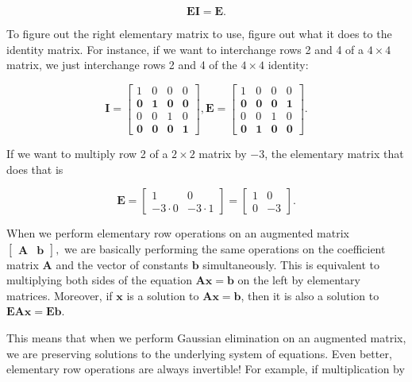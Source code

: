 \documentclass[
]{book}
\theoremstyle{definition}
\theoremstyle{definition}
\theoremstyle{definition}
\theoremstyle{definition}
\theoremstyle{remark}
\begin{document}
\[\mathbf{E}\mathbf{I}=\mathbf{E}.\]

To figure out the right elementary matrix to use, figure out what it does to the identity matrix. For instance, if we want to interchange rows 2 and 4 of a \(4\times 4\) matrix, we just interchange rows 2 and 4 of the \(4\times 4\) identity:

\[\mathbf{I}=\begin{bmatrix} 1 & 0 & 0 & 0\\\mathbf{0} & \mathbf{1} & \mathbf{0} & \mathbf{0}\\0 & 0 & 1 & 0\\\mathbf{0} & \mathbf{0} &\mathbf{0} &\mathbf{1}\end{bmatrix},\mathbf{E}=\begin{bmatrix} 1 & 0 & 0 & 0\\\mathbf{0} & \mathbf{0} &\mathbf{0} &\mathbf{1}\\0 & 0 & 1 & 0\\\mathbf{0} & \mathbf{1} & \mathbf{0} & \mathbf{0}\end{bmatrix}.\]

If we want to multiply row 2 of a \(2\times 2\) matrix by \(-3\), the elementary matrix that does that is

\[\mathbf{E}=\begin{bmatrix} 1 & 0 \\-3\cdot 0 & -3\cdot 1\end{bmatrix}=\begin{bmatrix} 1&0\\0&-3\end{bmatrix}.\]

When we perform elementary row operations on an augmented matrix \(\left[\begin{array}{c|c}\mathbf{A} & \mathbf{b}\end{array}\right],\) we are basically performing the same operations on the coefficient matrix \(\mathbf{A}\) and the vector of constants \(\mathbf{b}\) simultaneously. This is equivalent to multiplying both sides of the equation \(\mathbf{A}\mathbf{x}=\mathbf{b}\) on the left by elementary matrices. Moreover, if \(\mathbf{x}\) is a solution to \(\mathbf{A}\mathbf{x}=\mathbf{b}\), then it is also a solution to \(\mathbf{E}\mathbf{A}\mathbf{x}=\mathbf{E}\mathbf{b}\).

This means that when we perform Gaussian elimination on an augmented matrix, we are preserving solutions to the underlying system of equations. Even better, elementary row operations are always invertible! For example, if multiplication by
\end{document}
